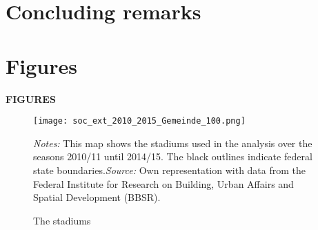 \documentclass[11pt, a4paper]{article} %
\begin{document}
\section{Concluding remarks}\label{sec_soc_ext:conclusion}




\newpage


%



\newpage
\TODO\section{Figures}
\vspace*{\fill}
{\Huge \begin{center}\textbf{FIGURES}\end{center}}
\vspace*{\fill}\clearpage



\vspace*{\fill}
\begin{figure}[H]\centering
	\caption{The stadiums}\label{fig_soc_ext: map_stadiums_gemeinde}
	\texttt{[image: soc\_ext\_2010\_2015\_Gemeinde\_100.png]}
	\begin{minipage}{0.95\linewidth}
		\scriptsize{\emph{Notes:} This map shows the stadiums used in the analysis over the seasons 2010/11 until 2014/15. The black outlines indicate federal state boundaries.\newline \emph{Source:} Own representation with data from the Federal Institute for Research on Building, Urban Affairs and Spatial Development (BBSR).}
	\end{minipage}
\end{figure}
\vspace*{\fill}\clearpage
\end{document}
